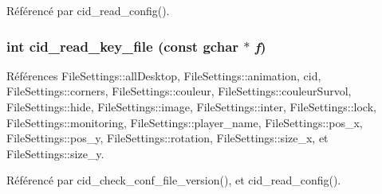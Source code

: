 Référencé par cid\_\-read\_\-config().
\subsubsection{\setlength{\rightskip}{0pt plus 5cm}int cid\_\-read\_\-key\_\-file (const gchar $\ast$ {\em f})}\label{cid-config_8h_0b6505cb73b9e5edfd90d08682687f7a}




Références FileSettings::allDesktop, FileSettings::animation, cid, FileSettings::corners, FileSettings::couleur, FileSettings::couleurSurvol, FileSettings::hide, FileSettings::image, FileSettings::inter, FileSettings::lock, FileSettings::monitoring, FileSettings::player\_\-name, FileSettings::pos\_\-x, FileSettings::pos\_\-y, FileSettings::rotation, FileSettings::size\_\-x, et FileSettings::size\_\-y.

Référencé par cid\_\-check\_\-conf\_\-file\_\-version(), et cid\_\-read\_\-config().